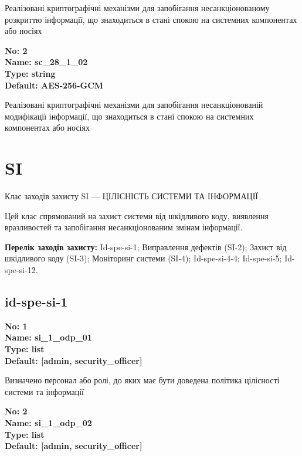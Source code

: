 \documentclass{article}
\begin{document}
{\footnotesize Реалізовані криптографічні механізми для запобігання несанкціонованому розкриттю інформації, що знаходиться в стані спокою на системних компонентах або носіях}


{\footnotesize\bfseries
No: 2\\
Name: sc\_\allowbreak{}28\_\allowbreak{}1\_\allowbreak{}02\\
Type: string\\
Default: \textquotedbl{}AES-256-GCM\textquotedbl{}
}

{\footnotesize Реалізовані криптографічні механізми для запобігання несанкціонованій модифікації інформації, що знаходиться в стані спокою на системних компонентах або носіях}




\section{SI}
Клас заходів захисту SI --- ЦІЛІСНІСТЬ СИСТЕМИ ТА ІНФОРМАЦІЇ

Цей клас спрямований на захист системи від шкідливого коду, виявлення вразливостей та запобігання несанкціонованим змінам інформації.

\textbf{Перелік заходів захисту:} Id-spe-si-1; Виправлення дефектів (SI-2); Захист від шкідливого коду (SI-3); Моніторинг системи (SI-4); Id-spe-si-4-4; Id-spe-si-5; Id-spe-si-12.

\subsection{id-spe-si-1}


\vspace{10pt}
{\footnotesize\bfseries
No: 1\\
Name: si\_\allowbreak{}1\_\allowbreak{}odp\_\allowbreak{}01\\
Type: list\\
Default: [\textquotedbl{}admin\textquotedbl{}, \textquotedbl{}security\_\allowbreak{}officer\textquotedbl{}]
}

{\footnotesize Визначено персонал або ролі, до яких має бути доведена політика цілісності системи та інформації}


{\footnotesize\bfseries
No: 2\\
Name: si\_\allowbreak{}1\_\allowbreak{}odp\_\allowbreak{}02\\
Type: list\\
Default: [\textquotedbl{}admin\textquotedbl{}, \textquotedbl{}security\_\allowbreak{}officer\textquotedbl{}]
}
\end{document}
